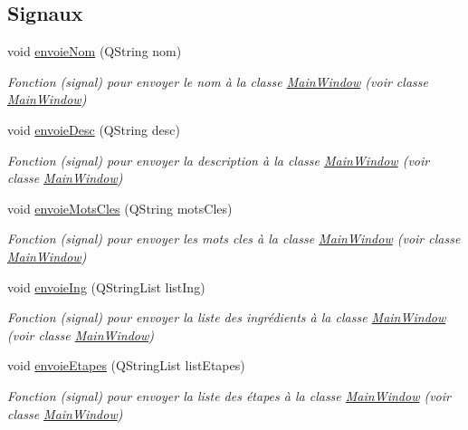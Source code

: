 \subsection*{Signaux}
\begin{DoxyCompactItemize}
\item 
void \hyperlink{classTraitement_a9f84743a77b0074f209eda21d32ee95b}{envoie\+Nom} (Q\+String nom)
\begin{DoxyCompactList}\small\item\em Fonction (signal) pour envoyer le nom à la classe \hyperlink{classMainWindow}{Main\+Window} (voir classe \hyperlink{classMainWindow}{Main\+Window}) \end{DoxyCompactList}\item 
void \hyperlink{classTraitement_afde7a0c290d7bc8204db5bf40d060a2e}{envoie\+Desc} (Q\+String desc)
\begin{DoxyCompactList}\small\item\em Fonction (signal) pour envoyer la description à la classe \hyperlink{classMainWindow}{Main\+Window} (voir classe \hyperlink{classMainWindow}{Main\+Window}) \end{DoxyCompactList}\item 
void \hyperlink{classTraitement_ac54c2833459c0fb24b0c15d589d05ef5}{envoie\+Mots\+Cles} (Q\+String mots\+Cles)
\begin{DoxyCompactList}\small\item\em Fonction (signal) pour envoyer les mots cles à la classe \hyperlink{classMainWindow}{Main\+Window} (voir classe \hyperlink{classMainWindow}{Main\+Window}) \end{DoxyCompactList}\item 
void \hyperlink{classTraitement_a630cf3c588e1d8436665e27b738930da}{envoie\+Ing} (Q\+String\+List list\+Ing)
\begin{DoxyCompactList}\small\item\em Fonction (signal) pour envoyer la liste des ingrédients à la classe \hyperlink{classMainWindow}{Main\+Window} (voir classe \hyperlink{classMainWindow}{Main\+Window}) \end{DoxyCompactList}\item 
void \hyperlink{classTraitement_af4b22f98a77f850cd0daf20f3cfa7c3a}{envoie\+Etapes} (Q\+String\+List list\+Etapes)
\begin{DoxyCompactList}\small\item\em Fonction (signal) pour envoyer la liste des étapes à la classe \hyperlink{classMainWindow}{Main\+Window} (voir classe \hyperlink{classMainWindow}{Main\+Window}) \end{DoxyCompactList}\item 

\end{DoxyCompactItemize}
